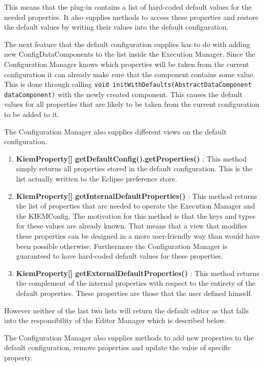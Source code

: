 This means that the plug-in contains a list of hard-coded default values for the needed properties.
It also supplies methods to access these properties and restore the default values by writing their values
into the default configuration.

\lstset{
backgroundcolor=,
}
The next feature that the default configuration supplies has to do with adding new ConfigDataComponents to the
list inside the Execution Manager. Since the Configuration Manager knows which properties will be taken from
the current configuration it can already make sure that the component contains some value. This is done
through calling \lstinline|void initWithDefaults(AbstractDataComponent dataComponent)| with the newly created component.
This causes the default values for all properties that are likely to be taken from the current configuration to
be added to it.

The Configuration Manager also supplies different views on the default configuration. 
\begin{enumerate}
 \item \textbf{KiemProperty[] getDefaultConfig().getProperties()} : This method simply returns all properties
stored in the default configuration. This is the list actually written to the Eclipse preference store.
 \item \textbf{KiemProperty[] getInternalDefaultProperties()} : This method returns the list of properties that
are needed to operate the Execution Manager and the \ac{KIEMConfig}. The motivation for this method is that
the keys and types for these values are already known. That means that a view that modifies these properties
can be designed in a more user-friendly way than would have been possible otherwise. Furthermore the Configuration 
Manager is guaranteed to have hard-coded default values for these properties.
 \item \textbf{KiemProperty[] getExternalDefaultProperties()} : This method returns the complement of the internal
properties with respect to the entirety of the default properties. These properties are those that the user defined
himself.
\end{enumerate}
However neither of the last two lists will return the default editor as that falls into the responsibility of
the Editor Manager which is described below.

The Configuration Manager also supplies methods to add new properties to the default configuration, remove properties
and update the value of specific property.

